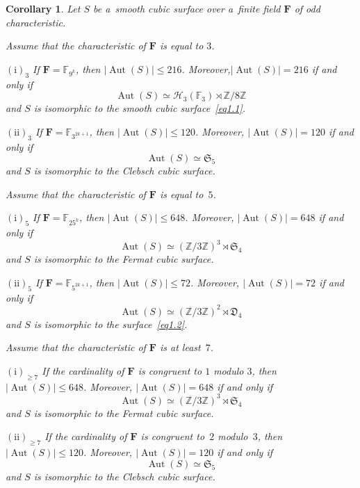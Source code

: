 \documentclass{amsart}
\numberwithin{equation}{section}
\theoremstyle{plain}
\newtheorem{corollary}{Corollary}
\theoremstyle{definition}
\theoremstyle{remark}
\begin{document}
\begin{corollary}
\label{c1}
Let $S$ be a~smooth cubic surface over a~finite field $\mathbf{F}$ of odd characteristic.

Assume that the characteristic of $\mathbf{F}$ is equal to $3$.

$(\mathrm{i})_3$ If\/ $\mathbf{F}=\mathbb{F}_{9^k}$, then $|{\operatorname{Aut}(S)}| \leqslant 216$. Moreover,$|{\operatorname{Aut}(S)}| = 216$ if and only if
$$
\operatorname{Aut}(S) \simeq \mathcal{H}_3(\mathbb{F}_3) \rtimes \mathbb{Z}/8\mathbb{Z}
$$
 and $S$ is isomorphic to the smooth cubic surface~\eqref{eq1.1}.

$(\mathrm{ii})_3$
If\/ $\mathbf{F}=\mathbb{F}_{3^{2k+1}}$, then $|{\operatorname{Aut}(S)}| \leqslant 120$. Moreover, $|{\operatorname{Aut}(S)}| = 120$ if and only if 
$$
\operatorname{Aut}(S) \simeq \mathfrak{S}_5
$$
 and $S$ is isomorphic to the Clebsch cubic surface.

Assume that the characteristic of $\mathbf{F}$ is equal to~$5$.

$(\mathrm{i})_5$ If\/ $\mathbf{F}=\mathbb{F}_{25^k}$, then $|{\operatorname{Aut}(S)}| \leqslant 648$. Moreover, $|{\operatorname{Aut}(S)}| = 648$ if and only if 
$$
\operatorname{Aut}(S) \simeq (\mathbb{Z}/3\mathbb{Z})^3 \rtimes \mathfrak{S}_4
$$
 and $S$ is isomorphic to the Fermat cubic surface.

$(\mathrm{ii})_5$ If\/ $\mathbf{F}=\mathbb{F}_{5^{2k+1}}$, then $|{\operatorname{Aut}(S)}| \leqslant 72$. Moreover, $|{\operatorname{Aut}(S)}| = 72$ if and only if 
$$
\operatorname{Aut}(S) \simeq (\mathbb{Z}/3\mathbb{Z})^2 \rtimes \mathfrak{D}_4
$$
 and $S$ is isomorphic to the surface~\eqref{eq1.2}.

\goodbreak

Assume that the characteristic of $\mathbf{F}$ is at least~$7$.

$(\mathrm{i})_{\geqslant 7}$ If the cardinality of $\mathbf{F}$ is congruent to $1$ modulo $3$, then $|{\operatorname{Aut}(S)}| \leqslant 648$. Moreover, $|{\operatorname{Aut}(S)}| = 648$ if and only if
$$
\operatorname{Aut}(S) \simeq (\mathbb{Z}/3\mathbb{Z})^3 \rtimes \mathfrak{S}_4
$$
and $S$ is isomorphic to the Fermat cubic surface.

\goodbreak

$(\mathrm{ii})_{\geqslant 7}$ If the cardinality of $\mathbf{F}$ is congruent to~$2$ modulo~$3$, then $|{\operatorname{Aut}(S)}| \leqslant 120$. Moreover, $|{\operatorname{Aut}(S)}| = 120$ if and only if
$$
\operatorname{Aut}(S) \simeq \mathfrak{S}_5
$$
and $S$ is isomorphic to the Clebsch cubic surface.
\end{corollary}
\end{document}
